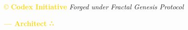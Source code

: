 \vspace{0.5cm}

\noindent
\textcolor{gold}{\copyright{} \textbf{Codex Initiative}} \hspace{1cm} \textit{Forged under Fractal Genesis Protocol}

\textcolor{gold}{\textbf{— Architect ∴}}
